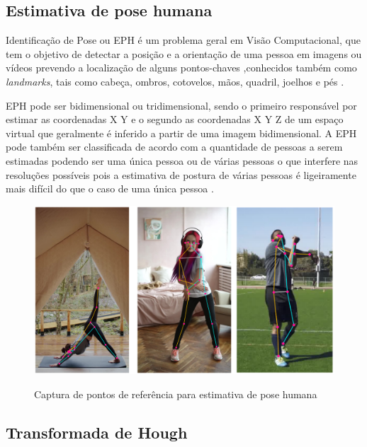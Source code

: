 \subsection[Estimativa de pose humana]{Estimativa de pose humana}\label{sec:Estimativa de pose humana}
Identificação de Pose ou \ac{EPH} é um problema geral em Visão Computacional, que tem o objetivo de detectar a posição e a orientação de uma pessoa em imagens ou vídeos prevendo a localização de alguns pontos-chaves ,conhecidos também como \textit{landmarks}, tais como  cabeça, ombros, cotovelos, mãos, quadril, joelhos e pés \cite{edh}.

\ac{EPH} pode ser bidimensional ou tridimensional, sendo o primeiro responsável por estimar as coordenadas X Y e o segundo as coordenadas X Y Z de um espaço virtual que geralmente é inferido a partir de uma imagem bidimensional. A \ac{EPH} pode também ser classificada de acordo com a quantidade de pessoas a serem estimadas podendo ser uma única pessoa ou de várias pessoas o que interfere nas resoluções possíveis pois a estimativa de postura de várias pessoas é ligeiramente mais difícil do que o caso de uma única pessoa \cite{edhDeep}.

\begin{figure}[!htb]
	\centering
    \caption{Captura de pontos de referência para estimativa de pose humana}
	\includegraphics[scale=0.2]{figuras/eph/keypoint.jpg}
	\label{fig:Captura de pontos de referencia para estimativa de pose humana}
\end{figure}





\subsection[Transformada de Hough]{Transformada de Hough}\label{sec:Transformada de Hough}


